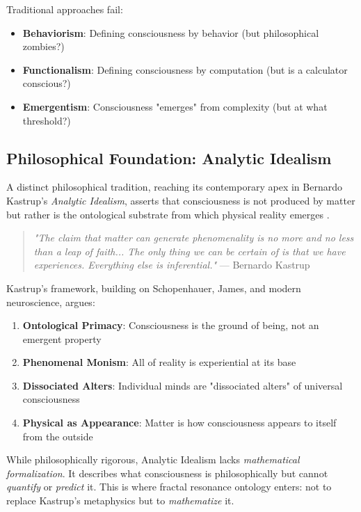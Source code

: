 Traditional approaches fail:
\begin{itemize}
\item \textbf{Behaviorism}: Defining consciousness by behavior (but philosophical zombies?)
\item \textbf{Functionalism}: Defining consciousness by computation (but is a calculator conscious?)
\item \textbf{Emergentism}: Consciousness "emerges" from complexity (but at what threshold?)
\end{itemize}

\subsection{Philosophical Foundation: Analytic Idealism}

A distinct philosophical tradition, reaching its contemporary apex in Bernardo Kastrup's \textit{Analytic Idealism}, asserts that consciousness is not produced by matter but rather is the ontological substrate from which physical reality emerges \cite{kastrup2019world,kastrup2018analytic}.

\begin{quote}
\textit{"The claim that matter can generate phenomenality is no more and no less than a leap of faith... The only thing we can be certain of is that we have experiences. Everything else is inferential."} \hfill --- Bernardo Kastrup \cite{kastrup2019world}
\end{quote}

Kastrup's framework, building on Schopenhauer, James, and modern neuroscience, argues:
\begin{enumerate}
\item \textbf{Ontological Primacy}: Consciousness is the ground of being, not an emergent property
\item \textbf{Phenomenal Monism}: All of reality is experiential at its base
\item \textbf{Dissociated Alters}: Individual minds are "dissociated alters" of universal consciousness
\item \textbf{Physical as Appearance}: Matter is how consciousness appears to itself from the outside
\end{enumerate}

While philosophically rigorous, Analytic Idealism lacks \textit{mathematical formalization}. It describes what consciousness is philosophically but cannot \textit{quantify} or \textit{predict} it. This is where fractal resonance ontology enters: not to replace Kastrup's metaphysics but to \textit{mathematize} it.

